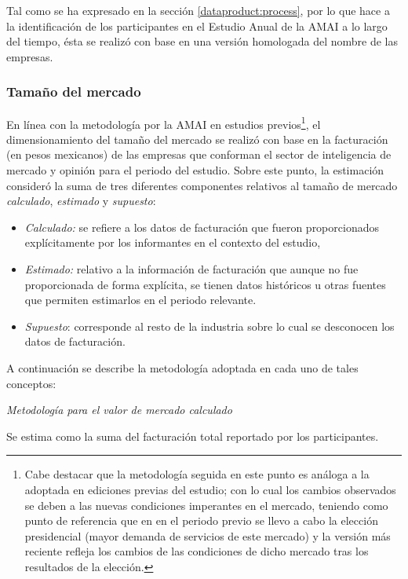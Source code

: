 Tal como se ha expresado en la sección \ref{dataproduct:process}, 
por lo que hace a la identificación de los participantes en el Estudio Anual de la AMAI a lo largo del tiempo, ésta se realizó con base en una versión homologada del nombre de las empresas. 

\subsubsection{Tamaño del mercado}

En línea con la metodología por la AMAI en estudios previos\footnote{Cabe destacar que la metodología seguida en este punto es análoga a la adoptada en ediciones previas del estudio; con lo cual los cambios observados se deben a las nuevas condiciones imperantes en el mercado, teniendo como punto de referencia que en en el periodo previo se llevo a cabo la elección presidencial (mayor demanda de servicios de este mercado) y la versión más reciente refleja los cambios de las condiciones de dicho mercado tras los resultados de la elección.}, el dimensionamiento del tamaño del mercado se realizó con base en la facturación (en pesos  mexicanos) de las empresas que conforman el sector de inteligencia de mercado y  opinión para el periodo del estudio. Sobre este punto, la estimación consideró la suma de tres diferentes componentes relativos al tamaño de mercado \emph{calculado}, \emph{estimado} y \emph{supuesto}:

\begin{itemize}
    \item \emph{Calculado:} se refiere a los datos de facturación que fueron proporcionados explícitamente por los informantes en el contexto del estudio,
    \item \emph{Estimado:} relativo a la información de facturación que aunque no fue proporcionada de forma explícita, se tienen datos históricos u otras fuentes que permiten estimarlos en el periodo relevante.
    \item \emph{Supuesto}: corresponde al resto de la industria sobre lo cual se desconocen los datos de facturación.
\end{itemize}

A continuación se describe la metodología adoptada en cada uno de tales
conceptos:\vspace{0.5cm}

\noindent \emph{Metodología para el valor de mercado calculado}

\noindent Se estima como la suma del facturación total reportado por los participantes.\\

